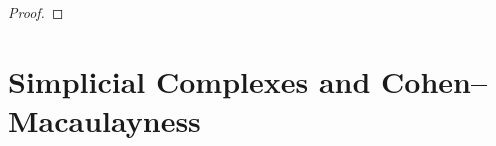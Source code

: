 \documentclass[ALCO,published]{cedram}
\numberwithin{equation}{section}
\renewcommand{\L}{\mathcal{L}}%
\DeclareMathOperator{\In}{\mathrm{in}}
\newcommand{\1}{^{-1}}
\def\Q{\mathsf{Q}}
\begin{document}
\begin{proof}
\end{proof}

\section{Simplicial Complexes and Cohen--Macaulayness}\label{sect:combinatorics}
\end{document}

